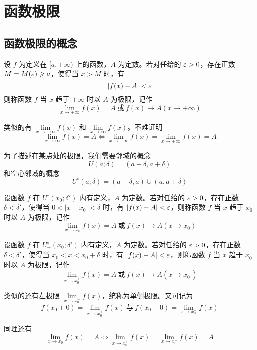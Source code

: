 
\chapter{函数极限}

\section{函数极限的概念}

\begin{definition}
	设 $f$ 为定义在 $[a,+\infty)$ 上的函数，$A$ 为定数。若对任给的 $\varepsilon>0$，存在正数 $M=M(\varepsilon) \geqslant a$，使得当 $x>M$ 时，有
	\[ |f(x)-A| < \varepsilon \]
	则称函数 $f$ 当 $x$ 趋于 $+\infty$ 时以 $A$ 为极限，记作
	\[ \lim_{x \to +\infty}f(x) = A\ \text{或}\ f(x) \to A(x \to +\infty) \]
\end{definition}

类似的有 $\lim\limits_{x \to -\infty}f(x)$ 和 $\lim\limits_{x \to \infty}f(x)$。不难证明
\[ \lim_{x \to \infty}f(x) = A \Leftrightarrow \lim_{x \to -\infty}f(x)=\lim_{x \to +\infty}f(x)=A \]

为了描述在某点处的极限，我们需要邻域的概念
\[ U(a;\delta) = (a-\delta,a+\delta) \]
和空心邻域的概念
\[ U^\circ (a;\delta) = (a-\delta,a) \cup (a, a+\delta) \]

\begin{definition}
	设函数 $f$ 在 $U^\circ(x_0;\delta')$ 内有定义，$A$ 为定数。若对任给的 $\varepsilon>0$，存在正数 $\delta<\delta'$，使得当 $0<|x-x_0|<\delta$ 时，有 $|f(x)-A|<\varepsilon$，则称函数 $f$ 当 $x$ 趋于 $x_0$ 时以 $A$ 为极限，记作
	\[ \lim_{x \to x_0}f(x) = A\ \text{或}\ f(x)\to A(x \to x_0) \]
\end{definition}

\begin{definition}
	设函数 $f$ 在 $U_+^\circ(x_0;\delta')$ 内有定义，$A$ 为定数。若对任给的 $\varepsilon>0$，存在正数 $\delta<\delta'$，使得当 $x_0<x<x_0+\delta$ 时，有 $|f(x)-A|<\varepsilon$，则称函数 $f$ 当 $x$ 趋于 $x_0^+$ 时以 $A$ 为极限，记作
	\[ \lim_{x \to x_0^+}f(x) = A\ \text{或}\ f(x)\to A(x \to x_0^+) \]
\end{definition}

类似的还有左极限 $\lim\limits_{x \to x_0^-}f(x)$，统称为单侧极限。又可记为
\[ f(x_0+0) = \lim_{x \to x_0^+}f(x)\ \text{与}\ f(x_0-0) = \lim_{x \to x_0^-}f(x) \]

同理还有
\[ \lim_{x \to x_0}f(x) = A \Leftrightarrow \lim_{x \to x_0^+}f(x)=\lim_{x \to x_0^-}f(x)=A \]

